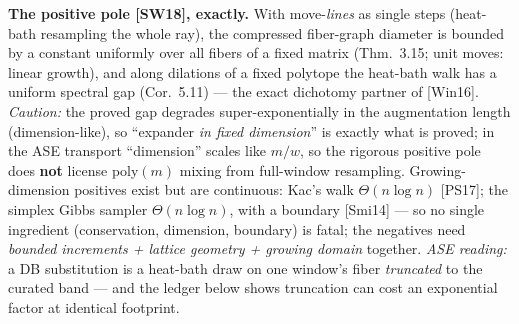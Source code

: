 \documentclass[11pt]{article}
\begin{document}
\textbf{The positive pole [SW18], exactly.} With move-\emph{lines} as single steps (heat-bath
resampling the whole ray), the compressed fiber-graph diameter is bounded by a constant uniformly
over all fibers of a fixed matrix (Thm.~3.15; unit moves: linear growth), and along dilations of a
fixed polytope the heat-bath walk has a uniform spectral gap (Cor.~5.11) --- the exact dichotomy
partner of [Win16]. \emph{Caution:} the proved gap degrades super-exponentially in the augmentation
length (dimension-like), so ``expander \emph{in fixed dimension}'' is exactly what is proved; in the
ASE transport ``dimension'' scales like $m/w$, so the rigorous positive pole does \textbf{not}
license poly$(m)$ mixing from full-window resampling. Growing-dimension positives exist but are
continuous: Kac's walk $\Theta(n\log n)$ [PS17]; the simplex Gibbs sampler $\Theta(n\log n)$, with a
boundary [Smi14] --- so no single ingredient (conservation, dimension, boundary) is fatal; the
negatives need \emph{bounded increments + lattice geometry + growing domain} together. \emph{ASE
reading:} a DB substitution is a heat-bath draw on one window's fiber \emph{truncated} to the curated
band --- and the ledger below shows truncation can cost an exponential factor at identical footprint.
\end{document}
